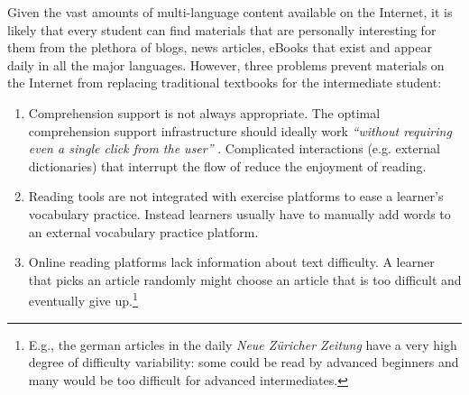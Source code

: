 
Given the vast amounts of multi-language content available on the Internet, it is likely that every student can find materials that are personally interesting for them from the plethora of blogs, news articles, eBooks that exist and appear daily in all the major languages. 
% 
% 
% 
% 
% 
% 
% 
However, three problems prevent materials on the Internet from replacing traditional textbooks for the intermediate student:

\begin{enumerate}
	

  \item Comprehension support is not always appropriate. The optimal comprehension support infrastructure should ideally work {\em ``without requiring even a single click from the user''} \cite{Proszeky02-Comprehension}. 
  Complicated interactions (e.g. external dictionaries) that interrupt the flow of reduce the enjoyment of reading.
  
  \item Reading tools are not integrated with exercise platforms to ease a learner's vocabulary practice. Instead learners usually have to manually add words to an external vocabulary practice platform. 

  \item Online reading platforms lack information about text difficulty. A learner that picks an article randomly might choose an article that is too difficult and eventually give up.\footnote{E.g., the german articles in the  daily {\em Neue Z\"uricher Zeitung} have a very high degree of difficulty variability: some could be read by advanced beginners and many would be too difficult for advanced intermediates.}

  
\end{enumerate}


